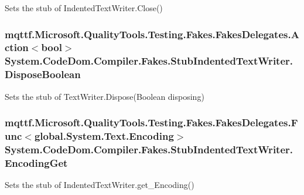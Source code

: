 Sets the stub of Indented\-Text\-Writer.\-Close()

\hypertarget{class_system_1_1_code_dom_1_1_compiler_1_1_fakes_1_1_stub_indented_text_writer_ab5b5ffd0174fc3234cc78fbf11293bba}{
\subsubsection[{Dispose\-Boolean}]{\setlength{\rightskip}{0pt plus 5cm}mqttf.\-Microsoft.\-Quality\-Tools.\-Testing.\-Fakes.\-Fakes\-Delegates.\-Action$<$bool$>$ System.\-Code\-Dom.\-Compiler.\-Fakes.\-Stub\-Indented\-Text\-Writer.\-Dispose\-Boolean}}\label{class_system_1_1_code_dom_1_1_compiler_1_1_fakes_1_1_stub_indented_text_writer_ab5b5ffd0174fc3234cc78fbf11293bba}


Sets the stub of Text\-Writer.\-Dispose(\-Boolean disposing)

\hypertarget{class_system_1_1_code_dom_1_1_compiler_1_1_fakes_1_1_stub_indented_text_writer_a617324c42af76d6b21ce8f22410b38f8}{
\subsubsection[{Encoding\-Get}]{\setlength{\rightskip}{0pt plus 5cm}mqttf.\-Microsoft.\-Quality\-Tools.\-Testing.\-Fakes.\-Fakes\-Delegates.\-Func$<$global.\-System.\-Text.\-Encoding$>$ System.\-Code\-Dom.\-Compiler.\-Fakes.\-Stub\-Indented\-Text\-Writer.\-Encoding\-Get}}\label{class_system_1_1_code_dom_1_1_compiler_1_1_fakes_1_1_stub_indented_text_writer_a617324c42af76d6b21ce8f22410b38f8}


Sets the stub of Indented\-Text\-Writer.\-get\-\_\-\-Encoding()

